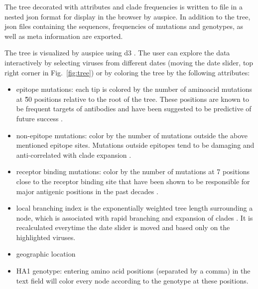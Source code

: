 \documentclass{bioinfo}
\newcommand{\FIG}[1]{Fig.~\ref{fig:#1}}
\begin{document}
The tree decorated with attributes and clade frequencies is written to file in
a nested json format for display in the browser by auspice. In addition to the
tree, json files containing the sequences, frequencies of mutations and
genotypes, as well as meta information are exported.

The tree is visualized by auspice using d3 \citep{d3}. The user can explore
the data interactively by selecting viruses from different dates (moving the
date slider, top right corner in \FIG{tree}) or by coloring the tree by the
following attributes:
\begin{itemize}
	\item epitope mutations: each tip is colored by the number of aminoacid mutations at \~50 
		  positions relative to the root of the tree. These positions are known to
		  be frequent targets of antibodies \citep{shih_simultaneous_2007} and have been
		  suggested to be predictive of future success \citep{luksza_predictive_2014}.
	\item non-epitope mutations: color by the number of mutations outside the above
		  mentioned epitope sites. Mutations outside epitopes tend to be damaging and 
		  anti-correlated with clade expansion \citep{luksza_predictive_2014}.
    \item receptor binding mutations: color by the number of mutations at 7 positions
    	  close to the receptor binding site that have been shown to be responsible 
    	  for major antigenic positions in the past decades \citep{koel_substitutions_2013}.
    \item local branching index is the exponentially weighted tree length surrounding 
    	  a node, which is associated with rapid branching and expansion of clades 
    	  \citep{neher_predicting_2014}. It is recalculated everytime the date slider is
    	  moved and based only on the highlighted viruses.
    \item geographic location
    \item HA1 genotype: entering amino acid positions (separated by a comma) in the 
    	  text field will color every node according to the genotype at these positions.
\end{itemize}
\end{document}
